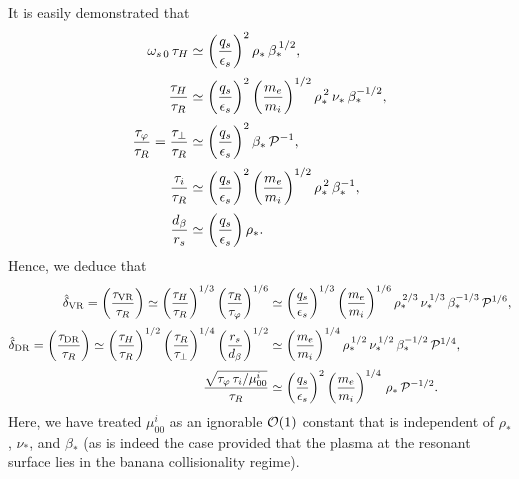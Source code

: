 \documentclass[12pt,prb,aps]{revtex4-1}
\begin{document}
It is easily demonstrated that
\begin{align}
\omega_{s\,0}\,\tau_H&\simeq \left(\frac{q_s}{\epsilon_s}\right)^2\rho_\ast\,\beta_\ast^{\,1/2},\\[0.5ex]
\frac{\tau_H}{\tau_R}&\simeq \left(\frac{q_s}{\epsilon_s}\right)^2\left(\frac{m_e}{m_i}\right)^{1/2}\rho_\ast^{\,2}\,\nu_\ast\,\beta_\ast^{-1/2},\\[0.5ex]
\frac{\tau_\varphi}{\tau_R} = \frac{\tau_\perp}{\tau_R} &\simeq \left(\frac{q_s}{\epsilon_s}\right)^2\beta_\ast\,{\cal P}^{-1},\\[0.5ex]
\frac{\tau_i}{\tau_R} &\simeq  \left(\frac{q_s}{\epsilon_s}\right)^2\left(\frac{m_e}{m_i}\right)^{1/2}\rho_\ast^{\,2}\,\beta_\ast^{-1},\\[0.5ex]
\frac{d_\beta}{r_s} &\simeq \left(\frac{q_s}{\epsilon_s}\right)\rho_\ast.
\end{align} 
Hence, we deduce that 
\begin{align}
\hat{\delta}_{\rm VR} = \left(\frac{\tau_{\rm VR}}{\tau_R}\right) \simeq\left(\frac{\tau_H}{\tau_R}\right)^{1/3}\left(\frac{\tau_R}{\tau_\varphi}\right)^{1/6}&\simeq \left(\frac{q_s}{\epsilon_s}\right)^{1/3}\left(\frac{m_e}{m_i}\right)^{1/6}\rho_\ast^{\,2/3}\,\nu_\ast^{\,1/3}\,\beta_\ast^{-1/3}\,{\cal P}^{1/6},\\[0.5ex]
\hat{\delta}_{\rm DR} = \left(\frac{\tau_{\rm DR}}{\tau_R}\right) \simeq \left(\frac{\tau_H}{\tau_R}\right)^{1/2}\left(\frac{\tau_R}{\tau_\perp}\right)^{1/4}\left(\frac{r_s}{d_\beta}\right)^{1/2}&\simeq \left(\frac{m_e}{m_i}\right)^{1/4}\rho_\ast^{\,1/2}\,\nu_\ast^{\,1/2}\,\beta_\ast^{-1/2}\,{\cal P}^{1/4},\\[0.5ex]
\frac{\sqrt{\tau_\varphi\, \tau_i/\mu_{00}^i}}{\tau_R}&\simeq \left(\frac{q_s}{\epsilon_s}\right)^2\left(\frac{m_e}{m_i}\right)^{1/4}\,\rho_\ast\,{\cal P}^{-1/2}.
\end{align}
Here, we have treated $\mu_{00}^i$ as an ignorable ${\cal O}(1)$ constant that is independent of $\rho_\ast$, $\nu_\ast$, and
$\beta_\ast$ (as is indeed the case provided that the plasma at the resonant surface lies in the banana collisionality regime).\cite{hs} 
\end{document}
